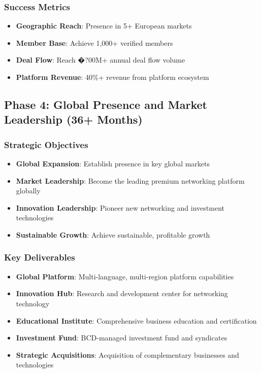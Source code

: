\subsubsection{Success Metrics}
\begin{itemize}
    \item \textbf{Geographic Reach}: Presence in 5+ European markets
    \item \textbf{Member Base}: Achieve 1,000+ verified members
    \item \textbf{Deal Flow}: Reach �?00M+ annual deal flow volume
    \item \textbf{Platform Revenue}: 40\%+ revenue from platform ecosystem
\end{itemize}

\subsection{Phase 4: Global Presence and Market Leadership (36+ Months)}

\subsubsection{Strategic Objectives}
\begin{itemize}
    \item \textbf{Global Expansion}: Establish presence in key global markets
    \item \textbf{Market Leadership}: Become the leading premium networking platform globally
    \item \textbf{Innovation Leadership}: Pioneer new networking and investment technologies
    \item \textbf{Sustainable Growth}: Achieve sustainable, profitable growth
\end{itemize}

\subsubsection{Key Deliverables}
\begin{itemize}
    \item \textbf{Global Platform}: Multi-language, multi-region platform capabilities
    \item \textbf{Innovation Hub}: Research and development center for networking technology
    \item \textbf{Educational Institute}: Comprehensive business education and certification
    \item \textbf{Investment Fund}: BCD-managed investment fund and syndicates
    \item \textbf{Strategic Acquisitions}: Acquisition of complementary businesses and technologies
\end{itemize}

